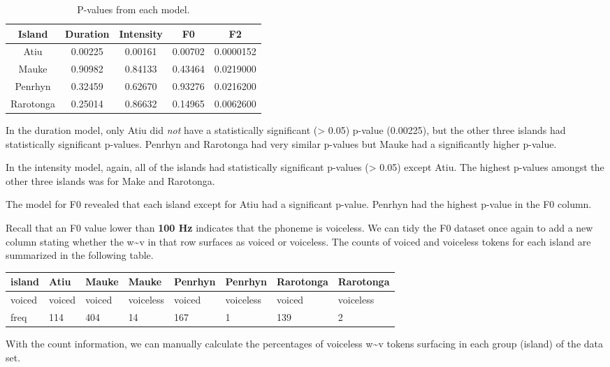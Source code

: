 \documentclass[
  ,man,floatsintext]{apa6}
\begin{document}
\begin{table}

\caption{\label{tab:p-vals-table}P-values from each model.}
\centering
\begin{tabular}[t]{c|c|c|c|c}
\hline
Island & Duration & Intensity & F0 & F2\\
\hline
Atiu & 0.00225 & 0.00161 & 0.00702 & 0.0000152\\
\hline
Mauke & 0.90982 & 0.84133 & 0.43464 & 0.0219000\\
\hline
Penrhyn & 0.32459 & 0.62670 & 0.93276 & 0.0216200\\
\hline
Rarotonga & 0.25014 & 0.86632 & 0.14965 & 0.0062600\\
\hline
\end{tabular}
\end{table}

In the duration model, only Atiu did \emph{not} have a statistically significant (\textgreater{} 0.05) p-value (0.00225), but the other three islands had statistically significant p-values. Penrhyn and Rarotonga had very similar p-values but Mauke had a significantly higher p-value.

In the intensity model, again, all of the islands had statistically significant p-values (\textgreater{} 0.05) except Atiu. The highest p-values amongst the other three islands was for Make and Rarotonga.

The model for F0 revealed that each island except for Atiu had a significant p-value. Penrhyn had the highest p-value in the F0 column.

Recall that an F0 value lower than \textbf{100 Hz} indicates that the phoneme is voiceless. We can tidy the F0 dataset once again to add a new column stating whether the w\textasciitilde v in that row surfaces as voiced or voiceless. The counts of voiced and voiceless tokens for each island are summarized in the following table.

\begin{tabular}{l|l|l|l|l|l|l|l}
\hline
island & Atiu & Mauke & Mauke & Penrhyn & Penrhyn & Rarotonga & Rarotonga\\
\hline
voiced & voiced & voiced & voiceless & voiced & voiceless & voiced & voiceless\\
\hline
freq & 114 & 404 & 14 & 167 & 1 & 139 & 2\\
\hline
\end{tabular}

With the count information, we can manually calculate the percentages of voiceless w\textasciitilde v tokens surfacing in each group (island) of the data set.
\end{document}
